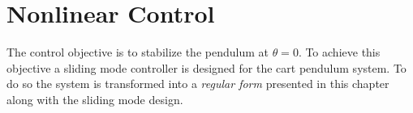 \chapter{Nonlinear Control}
The control objective is to stabilize the pendulum at $\theta = 0$. To achieve this objective a sliding mode controller is designed for the cart pendulum system. To do so the system is transformed into a \textit{regular form} presented in this chapter along with the sliding mode design.